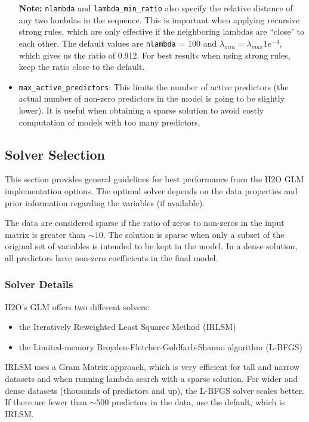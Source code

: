 \begin{itemize}
\textbf{Note:} \texttt{nlambda} and \texttt{lambda\_min\_ratio} also specify the relative distance of any two
 lambdas in the sequence. This is important when applying recursive strong rules, which are only effective if the neighboring lambdas are ``close" to each other. The default values are \texttt{nlambda} = 100 and $\lambda_{min}
= \lambda_{max} 1e^{-4}$, which gives us the ratio of 0.912.  For best results when using strong rules, keep the
ratio close to the default.

\item \texttt{max\_active\_predictors}: This limits the number of active predictors (the actual number of non-zero predictors in the model is going to be slightly lower). It is useful when obtaining a sparse solution to avoid costly computation of models with too many predictors.

\end{itemize}

\subsection{Solver Selection}

This section provides general guidelines for best performance from the H2O GLM implementation options. The optimal solver depends on the data properties and prior information regarding the variables (if available). 

The data are considered sparse if the ratio of zeros to non-zeros in the input matrix is greater than $\sim 10$. The solution is sparse when only a subset of the original set of variables is intended to be kept in the model. In a dense solution, all predictors have non-zero coefficients in the final model.  

\subsubsection{Solver Details}
H2O's GLM offers two different solvers: 

\begin{itemize}
\item the Iteratively Reweighted Least Squares Method (IRLSM)
\item the Limited-memory Broyden-Fletcher-Goldfarb-Shanno algorithm (L-BFGS)
\end{itemize}

IRLSM uses a Gram Matrix approach, which is very efficient for tall and narrow datasets and when running lambda search with a sparse solution.  For wider and dense
datasets (thousands of predictors and up), the L-BFGS solver scales better. If there are fewer than $\sim 500$ predictors in the data, use the default, which is IRLSM. 

